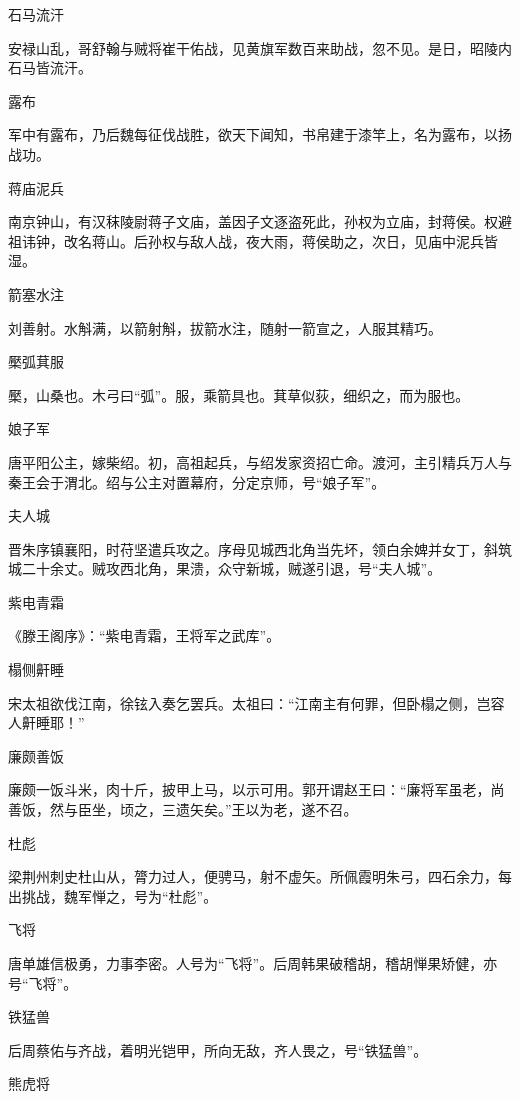 \documentclass[a4paper,12pt,UTF8,twoside]{ctexbook}
\begin{document}
    石马流汗
    
    安禄山乱，哥舒翰与贼将崔干佑战，见黄旗军数百来助战，忽不见。是日，昭陵内石马皆流汗。
    
    露布
    
    军中有露布，乃后魏每征伐战胜，欲天下闻知，书帛建于漆竿上，名为露布，以扬战功。
    
    蒋庙泥兵
    
    南京钟山，有汉秣陵尉蒋子文庙，盖因子文逐盗死此，孙权为立庙，封蒋侯。权避祖讳钟，改名蒋山。后孙权与敌人战，夜大雨，蒋侯助之，次日，见庙中泥兵皆湿。
    
    箭塞水注
    
    刘善射。水斛满，以箭射斛，拔箭水注，随射一箭宣之，人服其精巧。
    
    檿弧萁服
    
    檿，山桑也。木弓曰“弧”。服，乘箭具也。萁草似荻，细织之，而为服也。
    
    娘子军
    
    唐平阳公主，嫁柴绍。初，高祖起兵，与绍发家资招亡命。渡河，主引精兵万人与秦王会于渭北。绍与公主对置幕府，分定京师，号“娘子军”。
    
    夫人城
    
    晋朱序镇襄阳，时苻坚遣兵攻之。序母见城西北角当先坏，领白余婢并女丁，斜筑城二十余丈。贼攻西北角，果溃，众守新城，贼遂引退，号“夫人城”。
    
    紫电青霜
    
    《滕王阁序》：“紫电青霜，王将军之武库”。
    
    榻侧鼾睡
    
    宋太祖欲伐江南，徐铉入奏乞罢兵。太祖曰：“江南主有何罪，但卧榻之侧，岂容人鼾睡耶！”
    
    廉颇善饭
    
    廉颇一饭斗米，肉十斤，披甲上马，以示可用。郭开谓赵王曰：“廉将军虽老，尚善饭，然与臣坐，顷之，三遗矢矣。”王以为老，遂不召。
    
    杜彪
    
    梁荆州刺史杜山从，膂力过人，便骋马，射不虚矢。所佩霞明朱弓，四石余力，每出挑战，魏军惮之，号为“杜彪”。
    
    飞将
    
    唐单雄信极勇，力事李密。人号为“飞将”。后周韩果破稽胡，稽胡惮果矫健，亦号“飞将”。
    
    铁猛兽
    
    后周蔡佑与齐战，着明光铠甲，所向无敌，齐人畏之，号“铁猛兽”。
    
    熊虎将
    
\end{document}
